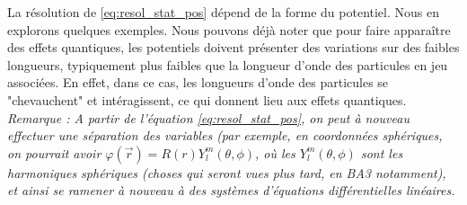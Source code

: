 \documentclass{book}
\begin{document}
La résolution de \eqref{eq:resol_stat_pos} dépend de la forme du potentiel. Nous en explorons quelques exemples. Nous pouvons déjà noter que pour faire apparaître des effets quantiques, les potentiels doivent présenter des variations sur des faibles longueurs, typiquement plus faibles que la longueur d'onde des particules en jeu associées. En effet, dans ce cas, les longueurs d'onde des particules se "chevauchent" et intéragissent, ce qui donnent lieu aux effets quantiques. \\

\textit{Remarque : A partir de l'équation \eqref{eq:resol_stat_pos}, on peut à nouveau effectuer une séparation des variables (par exemple, en coordonnées sphériques, on pourrait avoir $\varphi(\vec{r}) = R(r) Y^m_l(\theta, \phi)$, où les $Y^m_l(\theta, \phi)$ sont les harmoniques sphériques (choses qui seront vues plus tard, en BA3 notamment), et ainsi se ramener à nouveau à des systèmes d'équations différentielles linéaires.}
\end{document}
